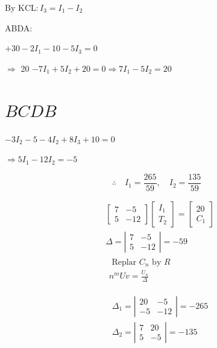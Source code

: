 \documentclass[12pt, a4paper]{article}
\begin{document}
By $\mathrm{KCL}: I_{3}=I_{1}-I_{2}$

ABDA:

$+30-2 I_{1}-10-5 I_{3}=0$

$\Rightarrow$ 20 $-7 I_{1}+5 I_{2}+20=0 \Rightarrow 7 I_{1}-5 I_{2}=20$

\section*{$B C D B$}
$-3 I_{2}-5-4 I_{2}+8 I_{3}+10=0$

$\Rightarrow 5 I_{1}-12 I_{2}=-5$

$$
	\therefore \quad I_{1}=\frac{265}{59}, \quad I_{2}=\frac{135}{59}
$$

$$
	\begin{aligned}
		 & {\left[\begin{array}{cc}
						          7 & -5  \\
						          5 & -12
					          \end{array}\right]\left[\begin{array}{l}
						                                  I_{1} \\
						                                  T_{2}
					                                  \end{array}\right]=\left[\begin{array}{l}
						                                                           20 \\
						                                                           C_{1}
					                                                           \end{array}\right]} \\
		 & \Delta=\left|\begin{array}{ll}
			                7 & -5  \\
			                5 & -12
		                \end{array}\right|=-59                                         \\
		 & \begin{array}{l}
			   \text { Replar } C_{n} \text { by } R \\
			   n^{m} U v=\frac{U_{n}}{\Delta}
		   \end{array}
	\end{aligned}
$$

$$
	\begin{aligned}
		 & \Delta_{1}=\left|\begin{array}{cc}
			                    20 & -5  \\
			                    -5 & -12
		                    \end{array}\right|=-265 \\
		 & \Delta_{2}=\left|\begin{array}{cc}
			                    7 & 20 \\
			                    5 & -5
		                    \end{array}\right|=-135
	\end{aligned}
$$
\end{document}
